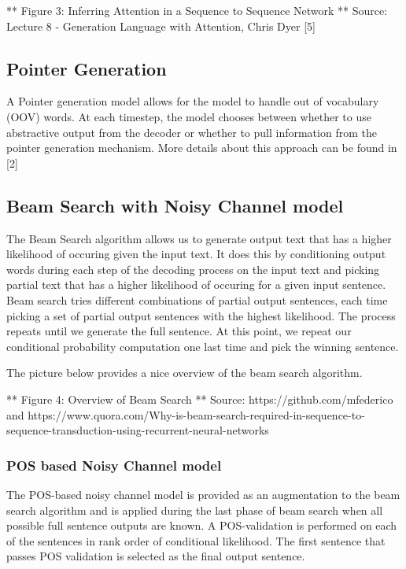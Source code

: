 \documentclass[11pt]{article}
\begin{document}
 ** Figure 3: Inferring Attention in a Sequence to Sequence Network **
Source: Lecture 8 - Generation Language with Attention, Chris Dyer
{[}5{]}

    \subsection{Pointer Generation}\label{pointer-generation}

A Pointer generation model allows for the model to handle out of
vocabulary (OOV) words. At each timestep, the model chooses between
whether to use abstractive output from the decoder or whether to pull
information from the pointer generation mechanism. More details about
this approach can be found in {[}2{]}

    \subsection{Beam Search with Noisy Channel
model}\label{beam-search-with-noisy-channel-model}

The Beam Search algorithm allows us to generate output text that has a
higher likelihood of occuring given the input text. It does this by
conditioning output words during each step of the decoding process on
the input text and picking partial text that has a higher likelihood of
occuring for a given input sentence. Beam search tries different
combinations of partial output sentences, each time picking a set of
partial output sentences with the highest likelihood. The process
repeats until we generate the full sentence. At this point, we repeat
our conditional probability computation one last time and pick the
winning sentence.

The picture below provides a nice overview of the beam search algorithm.

 ** Figure 4: Overview of Beam Search ** Source:
https://github.com/mfederico and
https://www.quora.com/Why-is-beam-search-required-in-sequence-to-sequence-transduction-using-recurrent-neural-networks

    \subsubsection{POS based Noisy Channel
model}\label{pos-based-noisy-channel-model}

The POS-based noisy channel model is provided as an augmentation to the
beam search algorithm and is applied during the last phase of beam
search when all possible full sentence outputs are known. A
POS-validation is performed on each of the sentences in rank order of
conditional likelihood. The first sentence that passes POS validation is
selected as the final output sentence.
\end{document}
